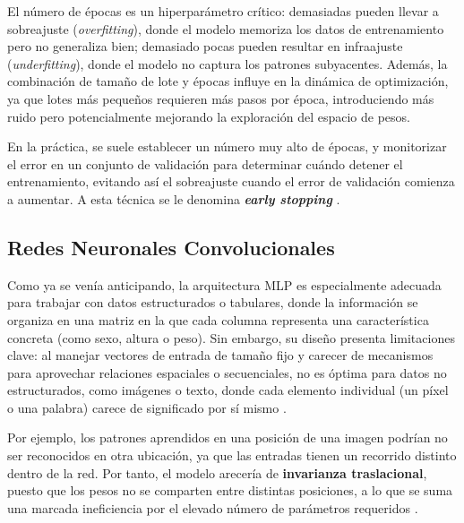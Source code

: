 \begin{itemize}
    El número de épocas es un hiperparámetro crítico: demasiadas pueden llevar a sobreajuste 
    (\textit{overfitting}), donde el modelo memoriza los datos de entrenamiento pero no generaliza bien; 
    demasiado pocas pueden resultar en infraajuste (\textit{underfitting}), donde el modelo no captura los 
    patrones subyacentes. Además, la combinación de tamaño de lote y épocas influye en la dinámica de 
    optimización, ya que lotes más pequeños requieren más pasos por época, introduciendo más ruido pero 
    potencialmente mejorando la exploración del espacio de pesos.

    En la práctica, se suele establecer un número muy alto de épocas, y monitorizar el error en un conjunto de
    validación para determinar cuándo detener el entrenamiento, evitando así el sobreajuste cuando el error de
    validación comienza a aumentar. A esta técnica se le denomina \textbf{\textit{early stopping}} 
    \cite{goodfellow2016}.
    
\end{itemize}



\subsection{Redes Neuronales Convolucionales}

Como ya se venía anticipando, la arquitectura \acrshort{MLP} es especialmente adecuada para trabajar con datos estructurados o tabulares, donde la información se organiza en una matriz en la que cada columna representa una característica concreta (como sexo, altura o peso). Sin embargo, su diseño presenta limitaciones clave: al manejar vectores de entrada de tamaño fijo y carecer de mecanismos para aprovechar relaciones espaciales o secuenciales, no es óptima para datos no estructurados, como imágenes o texto, donde cada elemento individual (un píxel o una palabra) carece de significado por sí mismo \cite{murphy2022}.

Por ejemplo, los patrones aprendidos en una posición de una imagen podrían no ser reconocidos en otra ubicación, ya que las entradas tienen un recorrido distinto dentro de la red. Por tanto, el modelo arecería       %
de \textbf{invarianza traslacional}, puesto que los pesos no se comparten entre distintas posiciones, a lo que 
se suma una marcada ineficiencia por el elevado número de parámetros requeridos \cite{szeliski2010}.

